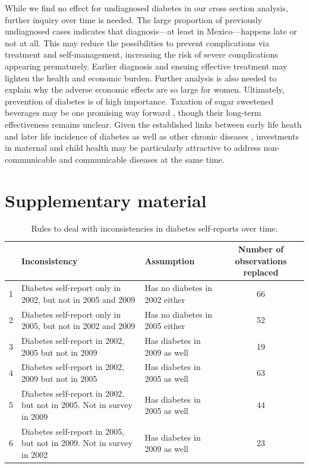 \documentclass[12pt,english]{article}
\providecommand{\tabularnewline}{\\}
\begin{document}
While we find no effect for undiagnosed diabetes in our cross section analysis, further inquiry over time is needed. The large proportion of previously undiagnosed cases indicates that diagnosis—at least in Mexico—happens late or not at all. This may reduce the possibilities to prevent complications via treatment and self-management, increasing the risk of severe complications appearing prematurely. Earlier diagnosis and ensuing effective treatment may lighten the health and economic burden. Further analysis is also needed to explain why the adverse economic effects are so large for women. Ultimately, prevention of diabetes is of high importance. Taxation of sugar sweetened beverages may be one promising way forward \parencite{Colchero2016}, though their long-term effectiveness remains unclear. Given the established links between early life heath and later life incidence of diabetes as well as other chronic diseases \parencite{Sotomayor2013,Hanson2012,Li2010b}, investments in maternal and child health may be particularly attractive to address non-communicable and communicable diseases at the same time.

\printbibliography


	
\clearpage
\setcounter{table}{0}
\renewcommand{\thetable}{S\arabic{table}}
\setcounter{figure}{0}
\setcounter{page}{1}
\renewcommand{\thefigure}{S\arabic{figure}} %
\section*{Supplementary material}

\begin{table}[!ht]
	\caption{\label{tab:Inconsistencies}Rules to deal with inconsistencies in diabetes self-reports over time.}
	\begin{center}
		\begin{adjustbox}{max width=\linewidth} 
			\begin{tabular}{lllc}
				\hline 
				&Inconsistency  & Assumption  & Number of observations replaced\tabularnewline
				\hline 
				1 &Diabetes self-report only in 2002, but not in 2005 and 2009  & Has no diabetes in 2002 either  & 66\tabularnewline
				2 &Diabetes self-report only in 2005, but not in 2002 and 2009  & Has no diabetes in 2005 either  & 52\tabularnewline
				3 &Diabetes self-report in 2002, 2005 but not in 2009  & Has diabetes in 2009 as well  & 19\tabularnewline
				4 &Diabetes self-report in 2002, 2009 but not in 2005  & Has diabetes in 2005 as well  & 63\tabularnewline
				5 &Diabetes self-report in 2002, but not in 2005. Not in survey in 2009  & Has diabetes in 2005 as well  & 44\tabularnewline
				6 &Diabetes self-report in 2005, but not in 2009. Not in survey in 2002  & Has diabetes in 2009 as well  & 23\tabularnewline
				\hline 
			\end{tabular}
		\end{adjustbox}
	\end{center}
\end{table}
\end{document}
